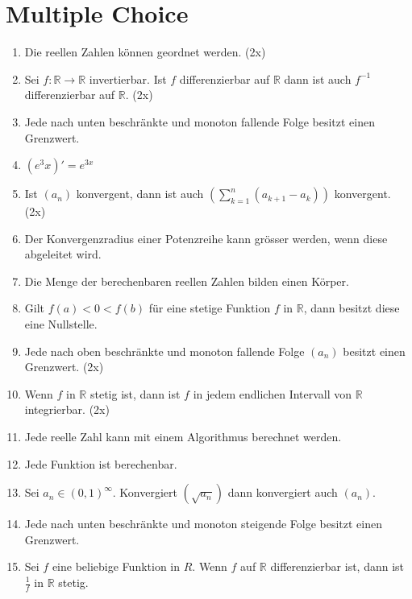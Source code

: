 \documentclass{article}
\begin{document}
\section*{Multiple Choice}

\begin{enumerate}[label=(\arabic*)]
    \item Die reellen Zahlen können geordnet werden. (2x)
    
    \item Sei $f: \mathbb{R} \to \mathbb{R}$ invertierbar. Ist $f$ differenzierbar auf $\mathbb{R}$ dann ist auch $f^{-1}$ differenzierbar auf $\mathbb{R}$. (2x)
    
    \item Jede nach unten beschränkte und monoton fallende Folge besitzt einen Grenzwert.
    
    \item $(e^3x)' = e^{3x}$
    
    \item Ist $(a_n)$ konvergent, dann ist auch $(\sum_{k = 1}^{n}(a_{k + 1} - a_k))$ konvergent. (2x)
    
    \item Der Konvergenzradius einer Potenzreihe kann grösser werden, wenn diese abgeleitet wird.

    \item Die Menge der berechenbaren reellen Zahlen bilden einen Körper.
    
    \item Gilt $f(a) < 0 < f(b)$ für eine stetige Funktion $f$ in $\mathbb{R}$, dann besitzt diese eine Nullstelle.
    
    \item Jede nach oben beschränkte und monoton fallende Folge $(a_n)$ besitzt einen Grenzwert. (2x)
    
    \item Wenn $f$ in $\mathbb{R}$ stetig ist, dann ist $f$ in jedem endlichen Intervall von $\mathbb{R}$ integrierbar. (2x)
        
    \item Jede reelle Zahl kann mit einem Algorithmus berechnet werden.
    
    \item Jede Funktion ist berechenbar.
    
    \item Sei $a_n \in (0, 1)^{\infty}$. Konvergiert $(\sqrt{a_n})$ dann konvergiert auch $(a_n)$.
    
    \item Jede nach unten beschränkte und monoton steigende Folge besitzt einen Grenzwert.
    
    \item Sei $f$ eine beliebige Funktion in $R$. Wenn $f$ auf $\mathbb{R}$ differenzierbar ist, dann ist $\frac{1}{f}$ in $\mathbb{R}$ stetig.
\end{enumerate}
\end{document}
